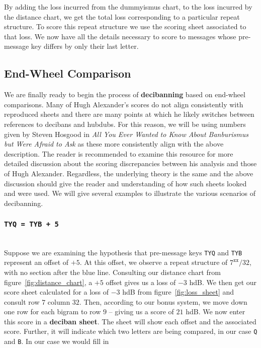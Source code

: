 \noindent By adding the loss incurred from the dummyismus chart, to
the loss incurred by the distance chart, we get the total loss
corresponding to a particular repeat structure. To score this repeat
structure we use the scoring sheet associated to that loss. We now
have all the details necessary to score to
messages whose pre-message key differs by only their last letter.

\subsection{End-Wheel Comparison}
We are finally ready to begin the process of {\bf{decibanning}}
based on end-wheel comparisons. Many of Hugh Alexander's scores do
not align consistently with reproduced sheets and there are many
points at which he likely switches between references to decibans
and hubdubs. For this reason, we will be using numbers given by
Steven Hosgood in \emph{All You Ever Wanted to Know About
Banburismus but Were Afraid to Ask} as these more consistently align
with the above description. The reader is recommended to examine
this resource for more detailed discussion about the scoring
discrepancies between his analysis and those of Hugh Alexander.
Regardless, the underlying theory is the same and the above
discussion should give the reader and understanding of how such
sheets looked and were used. We will give several examples to
illustrate the various scenarios of decibanning.
\subsubsection{\texttt{TYQ = TYB + 5}}
\text{}\\Suppose we are examining the hypothesis that pre-message
keys \texttt{TYQ} and \texttt{TYB} represent an offset of $+5$. At
this offset, we observe a repeat structure of $7^\texttt{xx}/32$,
with no section after the blue line. Consulting our distance chart
from figure~\ref{fig:distance_chart}, a $+5$ offset gives us a loss
of $-3$ hdB. We then get our score sheet calculated for a loss of
$-3$ hdB from figure~\ref{fig:loss_sheet} and consult row $7$
column $32$. Then, according to our bonus system, we move down one
row for each bigram to row $9$ -- giving us a score of $21$ hdB. We
now enter this score in a  {\bf{deciban sheet}}. The sheet will
show each offset and the associated score. Further, it will
indicate which two letters are being compared, in our case
\texttt{Q} and \texttt{B}. In our case we would fill in


